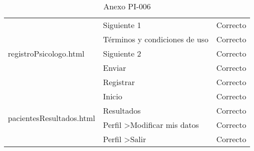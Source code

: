 \begin{table}[htpb]
\begin{tabularx}{\textwidth}{|l|X|l|}
\multirow{5}{*}{registroPsicologo.html}   & Siguiente 1                                         & Correcto            \\ \cline{2-3} 
                                          & Términos y condiciones de uso                       & Correcto            \\ \cline{2-3} 
                                          & Siguiente 2                                         & Correcto            \\ \cline{2-3} 
                                          & Enviar                                              & Correcto            \\ \cline{2-3} 
                                          & Registrar                                           & Correcto            \\ \hline
\multirow{4}{*}{pacientesResultados.html} & Inicio                                              & Correcto            \\ \cline{2-3} 
                                          & Resultados                                          & Correcto            \\ \cline{2-3} 
                                          & Perfil \textgreater Modificar mis datos             & Correcto            \\ \cline{2-3} 
                                          & Perfil \textgreater Salir                           & Correcto            \\ \hline
\end{tabularx}
\caption{Anexo PI-006}
\end{table}


